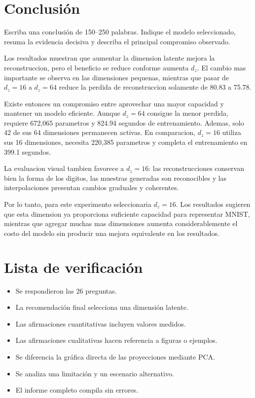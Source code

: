 \documentclass[11pt,letterpaper]{article}
\begin{document}
\section{Conclusión}

Escriba una conclusión de 150--250 palabras. Indique el modelo seleccionado,
resuma la evidencia decisiva y describa el principal compromiso observado.
\begin{responsebox}


Los resultados muestran que aumentar la dimension latente mejora la reconstruccion, pero el beneficio se reduce conforme aumenta $d_z$. El cambio mas importante se observa en las dimensiones pequenas, mientras que pasar de $d_z=16$ a $d_z=64$ reduce la perdida de reconstruccion solamente de 80.83 a 75.78.

Existe entonces un compromiso entre aprovechar una mayor capacidad y mantener un modelo eficiente. Aunque $d_z=64$ consigue la menor perdida, requiere 672,065 parametros y 824.94 segundos de entrenamiento. Ademas, solo 42 de sus 64 dimensiones permanecen activas. En comparacion, $d_z=16$ utiliza sus 16 dimensiones, necesita 220,385 parametros y completa el entrenamiento en 399.1 segundos.

La evaluacion visual tambien favorece a $d_z=16$: las reconstrucciones conservan bien la forma de los digitos, las muestras generadas son reconocibles y las interpolaciones presentan cambios graduales y coherentes.

Por lo tanto, para este experimento seleccionaria $d_z=16$. Los resultados sugieren que esta dimension ya proporciona suficiente capacidad para representar MNIST, mientras que agregar muchas mas dimensiones aumenta considerablemente el costo del modelo sin producir una mejora equivalente en los resultados.

\end{responsebox}

\section*{Lista de verificación}
\begin{itemize}[label=$\boxed{\times}$,leftmargin=*]
  \item Se respondieron las 26 preguntas. 
  \item La recomendación final selecciona una dimensión latente.
  \item Las afirmaciones cuantitativas incluyen valores medidos.
  \item Las afirmaciones cualitativas hacen referencia a figuras o ejemplos.
  \item Se diferencia la gráfica directa de las proyecciones mediante PCA.
  \item Se analiza una limitación y un escenario alternativo.
  \item El informe completo compila sin errores.
\end{itemize}
\end{document}
